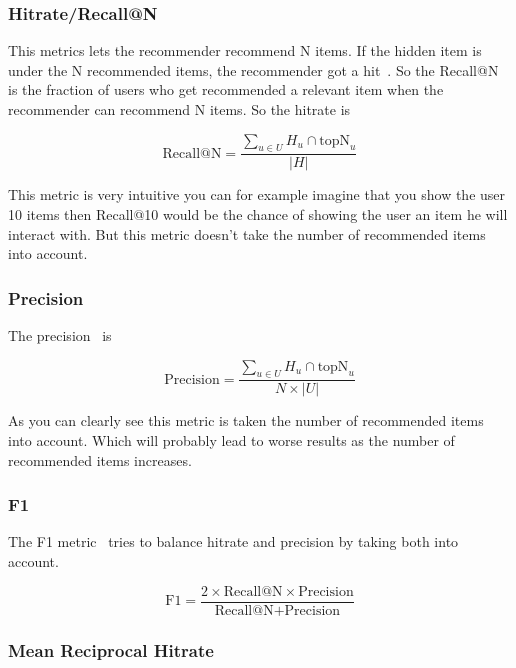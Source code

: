 \subsubsection{Hitrate/Recall@N}

This metrics lets the recommender recommend N items. If the hidden
item is under the N recommended items, the recommender got a 
hit~\cite{Karypis:2001:EIT:502585.502627, Sarwar00applicationof}.
So the Recall@N is the fraction of users who get recommended a
relevant item when the recommender can recommend N items.
So the hitrate is 

\begin{equation} 
\text{Recall@N}=\frac{\sum_{u \in U} H_u \cap \text{topN}_u}{|H|}
\end{equation}


This metric is very intuitive you can for example imagine that you
show the user 10 items then Recall@10 would be the chance of showing
the user an item he will interact with. But this metric doesn't take
the number of recommended items into account.


\subsubsection{Precision}

The precision~\cite{Sarwar00applicationof} is 

\begin{equation} 
\text{Precision}=\frac{\sum_{u \in U} H_u \cap \text{topN}_u}{N \times |U|}
\end{equation}


As you can clearly see this metric is taken the number of recommended
items into account. Which will probably lead to worse results as the
number of recommended items increases.


\subsubsection{F1}

The F1 metric~\cite{Sarwar00applicationof} tries to balance hitrate and precision
by taking both into account.

\begin{equation}
\text{F1}=\frac{2 \times \text{Recall@N} \times \text{Precision}}{\text{Recall@N} + \text{Precision}}
\end{equation}


\subsubsection{Mean Reciprocal Hitrate}

